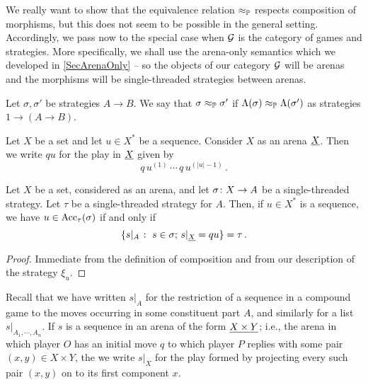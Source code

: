 \documentclass{report}[11pt]
\begin{document}
We really want to show that the equivalence relation $\approx_{\mathbb{P}}$ respects composition of morphisms, but this does not seem to be possible in the general setting.  
Accordingly, we pass now to the special case when $\mathcal G$ is the category of games and strategies.  
More specifically, we shall use the arena-only semantics which we developed in \sec\ref{SecArenaOnly} -- so the objects of our category $\mathcal G$ will be arenas and the morphisms will be single-threaded strategies between arenas.

\begin{definition}
  Let $\sigma,\sigma'$ be strategies $A \to B$.  
  We say that $\sigma\approx_{\mathbb{P}}\sigma'$ if $\Lambda(\sigma)\approx_{\mathbb{P}}\Lambda(\sigma')$ as strategies $1 \to (A \to B)$.
\end{definition}

\begin{definition}
  Let $X$ be a set and let $u\in X^*$ be a sequence.  
  Consider $X$ as an arena ${\underline{X}}$.  
  Then we write $qu$ for the play in ${\underline{X}}$ given by
  \[
    q\,u^{(1)}\,\cdots\,q\,u^{(|u|-1)}\,.
    \]
\end{definition}

\begin{proposition}
  Let $X$ be a set, considered as an arena, and let $\sigma \colon X \to A$ be a single-threaded strategy.
  Let $\tau$ be a single-threaded strategy for $A$.  
  Then, if $u\in X^*$ is a sequence, we have $u\in\operatorname{Acc}_\tau(\sigma)$ if and only if
  \[
    \{s\vert_A \;\colon\; s\in\sigma;\,s\vert_{{\underline{X}}} = qu\} = \tau\,.
    \]
\end{proposition}
\begin{proof}
  Immediate from the definition of composition and from our description of the strategy $\xi_u$.
\end{proof}

\begin{definition}
  Recall that we have written $s\vert_A$ for the restriction of a sequence in a compound game to the moves occurring in some constituent part $A$, and similarly for a list $s\vert_{A_1,\cdots,A_n}$.
  If $s$ is a sequence in an arena of the form ${\underline{X\times Y}}$; i.e., the arena in which player $O$ has an initial move $q$ to which player $P$ replies with some pair $(x,y)\in X\times Y$, the we write $s\vert_X$ for the play formed by projecting every such pair $(x,y)$ on to its first component $x$.
\end{definition}
\end{document}
